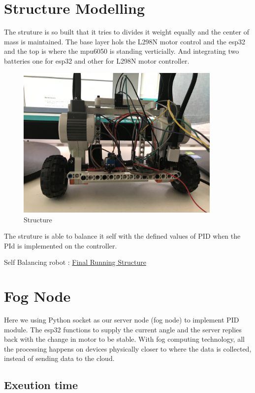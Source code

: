 \documentclass{article}
\begin{document}
  \section{Structure Modelling}
  The struture is so built that it tries to divides it weight equally and the center of mass is maintained. The base layer hols the L298N motor control and the esp32 and the top is where the mpu6050 is standing verticially. And integrating two batteries one for esp32 and other for L298N motor controller.
  
  	\begin{figure}[h]
 			\centering
 			\includegraphics[width=100mm,scale=0.5]{Structure}
 			\caption{Structure}
 			\label{Structure }
 		\end{figure}
 		
 	The struture is able to balance it self with the defined values of PID when the PId is implemented on the controller.
 	
 	Self Balancing robot : \href{https://photos.app.goo.gl/xHS9JjkftqMNMiwo9}{Final Running Structure}
 		 
  
  \section{Fog Node}
  Here we using Python socket as our server node (fog node) to implement PID module. The esp32 functions to supply the current angle and the server replies back with the change in motor to be stable. 
  With fog computing technology, all the processing happens on devices physically closer to where the data is collected, instead of sending data to the cloud.
  
  \subsection{Exeution time}
  
\end{document}
